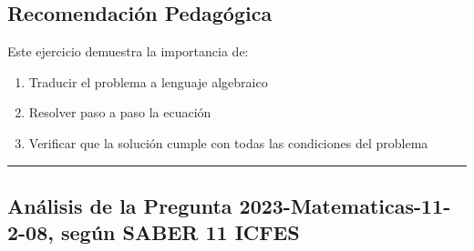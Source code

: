 \documentclass[
]{article}
\providecommand{\tightlist}{%
  \setlength{\itemsep}{0pt}\setlength{\parskip}{0pt}}
\begin{document}
\subsection{Recomendación
Pedagógica}\label{recomendaciuxf3n-pedaguxf3gica}

Este ejercicio demuestra la importancia de:

\begin{enumerate}
\def\labelenumi{\arabic{enumi}.}
\tightlist
\item
  Traducir el problema a lenguaje algebraico
\item
  Resolver paso a paso la ecuación
\item
  Verificar que la solución cumple con todas las condiciones del
  problema
\end{enumerate}

\begin{center}\rule{0.5\linewidth}{0.5pt}\end{center}

\subsection{Análisis de la Pregunta 2023-Matematicas-11-2-08, según
SABER 11
ICFES}\label{anuxe1lisis-de-la-pregunta-2023-matematicas-11-2-08-seguxfan-saber-11-icfes}
\end{document}

